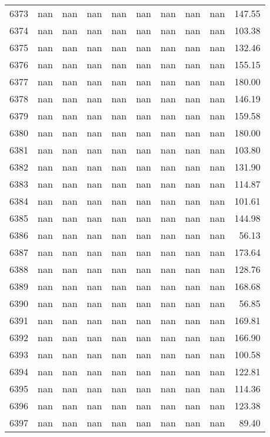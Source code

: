 \begin{tabular}{lrrrrrrrrr}
6373 & nan & nan & nan & nan & nan & nan & nan & nan & 147.55 \\
6374 & nan & nan & nan & nan & nan & nan & nan & nan & 103.38 \\
6375 & nan & nan & nan & nan & nan & nan & nan & nan & 132.46 \\
6376 & nan & nan & nan & nan & nan & nan & nan & nan & 155.15 \\
6377 & nan & nan & nan & nan & nan & nan & nan & nan & 180.00 \\
6378 & nan & nan & nan & nan & nan & nan & nan & nan & 146.19 \\
6379 & nan & nan & nan & nan & nan & nan & nan & nan & 159.58 \\
6380 & nan & nan & nan & nan & nan & nan & nan & nan & 180.00 \\
6381 & nan & nan & nan & nan & nan & nan & nan & nan & 103.80 \\
6382 & nan & nan & nan & nan & nan & nan & nan & nan & 131.90 \\
6383 & nan & nan & nan & nan & nan & nan & nan & nan & 114.87 \\
6384 & nan & nan & nan & nan & nan & nan & nan & nan & 101.61 \\
6385 & nan & nan & nan & nan & nan & nan & nan & nan & 144.98 \\
6386 & nan & nan & nan & nan & nan & nan & nan & nan & 56.13 \\
6387 & nan & nan & nan & nan & nan & nan & nan & nan & 173.64 \\
6388 & nan & nan & nan & nan & nan & nan & nan & nan & 128.76 \\
6389 & nan & nan & nan & nan & nan & nan & nan & nan & 168.68 \\
6390 & nan & nan & nan & nan & nan & nan & nan & nan & 56.85 \\
6391 & nan & nan & nan & nan & nan & nan & nan & nan & 169.81 \\
6392 & nan & nan & nan & nan & nan & nan & nan & nan & 166.90 \\
6393 & nan & nan & nan & nan & nan & nan & nan & nan & 100.58 \\
6394 & nan & nan & nan & nan & nan & nan & nan & nan & 122.81 \\
6395 & nan & nan & nan & nan & nan & nan & nan & nan & 114.36 \\
6396 & nan & nan & nan & nan & nan & nan & nan & nan & 123.38 \\
6397 & nan & nan & nan & nan & nan & nan & nan & nan & 89.40 \\

\end{tabular}
